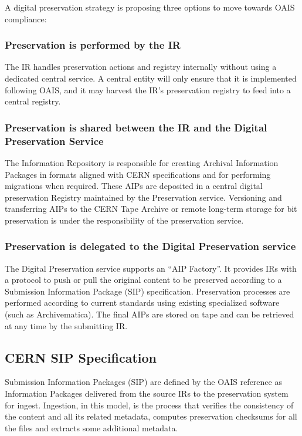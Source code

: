 \documentclass[11pt]{IEEEtran}
\begin{document}
 A digital preservation strategy\cite{strategy} is proposing three options to move towards OAIS compliance:
 
\subsubsection{Preservation is performed by the IR} The IR handles preservation actions and registry internally without using a dedicated central service. A central entity will only ensure that it is implemented following OAIS, and it may harvest the IR's preservation registry to feed into a central registry.

\subsubsection{Preservation is shared between the IR and the Digital Preservation Service}

The Information Repository is responsible for creating Archival Information Packages in formats aligned with CERN specifications and for performing migrations when required. These AIPs are deposited in a central digital preservation Registry maintained by the Preservation service. Versioning and transferring AIPs to the CERN Tape Archive or remote long-term storage for bit preservation is under the responsibility of the preservation service. 

\subsubsection{Preservation is delegated to the Digital Preservation service}

The Digital Preservation service supports an “AIP Factory”. It provides IRs with a protocol to push or pull the original content to be preserved according to a Submission Information Package (SIP) specification. Preservation processes are performed according to current standards using existing specialized software (such as Archivematica). The final AIPs are stored on tape and can be retrieved at any time by the submitting IR. 

\subsection{CERN SIP Specification}

Submission Information Packages (SIP) are defined by the OAIS reference as Information Packages  delivered from the source IRs to the preservation system for ingest. Ingestion, in this model, is the process that verifies the consistency of the content and all its related metadata, computes preservation checksums for all the files and extracts some additional metadata.
\end{document}
